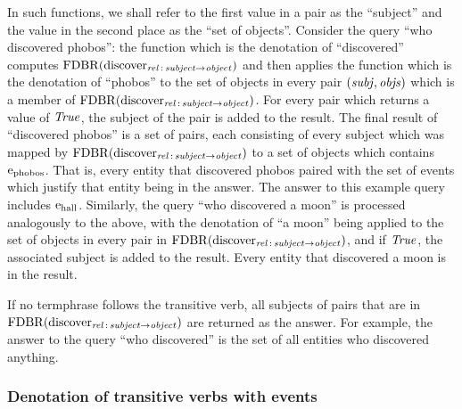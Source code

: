 \documentclass[../main.tex]{subfiles}
\begin{document}
\begin{refsection}
In such functions, we shall refer to the first value in a pair as the ``subject'' and the value in
the second place as the ``set of objects''.
Consider the query ``who discovered phobos'': the function which is the denotation
of ``discovered'' computes $\operatorname{FDBR}({\operatorname{discover}_{\operatorname{\mathit{rel}}\,:\,\operatorname{\mathit{subject}} \rightarrow \operatorname{\mathit{object}}}})$ and then applies the function which is the
denotation of ``phobos'' to the set of objects in every pair $(\operatorname{\mathit{subj}}, \operatorname{\mathit{objs}})$ which is a member of
$\operatorname{FDBR}({\operatorname{discover}_{\operatorname{\mathit{rel}}\,:\,\operatorname{\mathit{subject}} \rightarrow \operatorname{\mathit{object}}}})$. For every pair which returns a value of $\operatorname{\mathit{True}}$, the subject of the pair is added to
the result. The final result of ``discovered
phobos'' is a set of pairs, each consisting of every subject which was mapped by $\operatorname{FDBR}({\operatorname{discover}_{\operatorname{\mathit{rel}}\,:\,\operatorname{\mathit{subject}} \rightarrow \operatorname{\mathit{object}}}})$
to a set of objects which contains $\mathrm{e}_{\operatorname{phobos}}$. That is, every entity that discovered phobos paired with the set of events which justify that entity being in the answer. The
answer to this example query includes $\mathrm{e}_{\operatorname{hall}}$. Similarly, the query ``who discovered a moon'' is
processed analogously to the above, with the denotation of ``a moon'' being applied to the set of
objects in every pair in $\operatorname{FDBR}({\operatorname{discover}_{\operatorname{\mathit{rel}}\,:\,\operatorname{\mathit{subject}} \rightarrow \operatorname{\mathit{object}}}})$, and if $\operatorname{\mathit{True}}$, the associated subject is added to
the result. Every entity that discovered a moon is in the result.

If no termphrase follows the transitive verb, all subjects of pairs that are in
$\operatorname{FDBR}({\operatorname{discover}_{\operatorname{\mathit{rel}}\,:\,\operatorname{\mathit{subject}} \rightarrow \operatorname{\mathit{object}}}})$ are returned as the answer. For example, the answer to the query
``who discovered'' is the set of all entities who discovered anything.

\subsubsection{Denotation of transitive verbs with events}
\label{ext:transevents}


\end{refsection}
\end{document}

